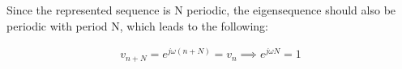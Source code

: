 Since the represented sequence is N periodic, the eigensequence should also be periodic with period N, which leads to the following:

\begin{align*}
	v_{n+N} = e^{j\omega (n+N)} = v_n \implies e^{j\omega N} = 1
\end{align*}

